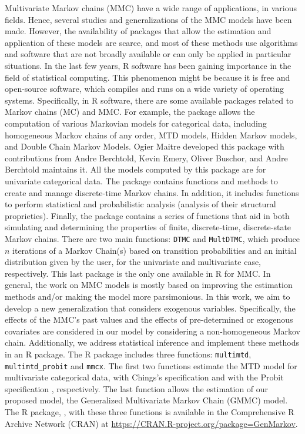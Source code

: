 Multivariate Markov chains (MMC) have a wide range of applications, in various fields. Hence, several studies and generalizations of the MMC models have been made. However, the availability of packages that allow the estimation and application of these models are scarce, and most of these methods use algorithms and software that are not broadly available or can only be applied in particular situations. In the last few years, R software has been gaining importance in the field of statistical computing. This phenomenon might be because it is free and open-source software, which compiles and runs on a wide variety of operating systems. Specifically, in R software, there are some available packages related to Markov chains (MC) and MMC. For example, the  package \citep{march, Berchtold2020} allows the computation of various Markovian models for categorical data, including homogeneous Markov chains of any order, MTD models, Hidden Markov models, and Double Chain Markov Models. Ogier Maitre developed this package with contributions from Andre Berchtold, Kevin Emery, Oliver Buschor, and Andre Berchtold maintains it. All the models computed by this package are for univariate categorical data. The  package \citep{markovchains} contains functions and methods to create and manage discrete-time Markov chains. In addition, it includes functions to perform statistical and probabilistic analysis (analysis of their structural proprieties). Finally, the  package \citep{DTMCPack} contains a series of functions that aid in both simulating and determining the properties of finite, discrete-time, discrete-state Markov chains. There are two main functions: \texttt{DTMC} and \texttt{MultDTMC}, which produce \(n\) iterations of a Markov Chain(s) based on transition probabilities and an initial distribution given by the user, for the univariate and multivariate case, respectively. This last package is the only one available in R for MMC. In general, the work on MMC models is mostly based on improving the estimation methods and/or making the model more parsimonious. In this work, we aim to develop a new generalization that considers exogenous variables. Specifically, the effects of the MMC's past values and the effects of pre-determined or exogenous covariates are considered in our model by considering a non-homogeneous Markov chain. Additionally, we address statistical inference and implement these methods in an R package. The R package includes three functions: \texttt{multimtd}, \texttt{multimtd\_probit} and \texttt{mmcx}. The first two functions estimate the MTD model for multivariate categorical data, with Chings's specification \citep{Ching2002} and with the Probit specification \citep{Nicolau2014}, respectively. The last function allows the estimation of our proposed model, the Generalized Multivariate Markov Chain (GMMC) model. The R package, , with these three functions is available in the Comprehensive R Archive Network (CRAN) at \url{https://CRAN.R-project.org/package=GenMarkov}.

